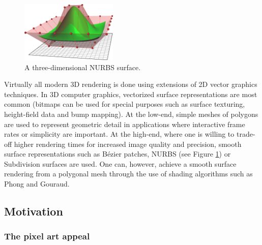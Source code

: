 \documentclass[]{usiinfbachelorproject}
\begin{document}
\begin{figure}
	\centering
	\includegraphics[width=0.41\textwidth]{img/nurbs.png}
	\caption{A three-dimensional NURBS surface.}
	\label{fig:nurbs}
\end{figure}
\noindent Virtually all modern 3D rendering is done using extensions of 2D vector graphics techniques. In 3D computer graphics, vectorized surface representations are most common (bitmaps can be used for special purposes such as surface texturing, height-field data and bump mapping). At the low-end, simple meshes of polygons are used to represent geometric detail in applications where interactive frame rates or simplicity are important. At the high-end, where one is willing to trade-off higher rendering times for increased image quality and precision, smooth surface representations such as B\'ezier patches, NURBS (see Figure \ref{fig:nurbs}) or Subdivision surfaces are used. One can, however, achieve a smooth surface rendering from a polygonal mesh through the use of shading algorithms such as Phong and Gouraud.


\subsection{Motivation}

\subsubsection{The pixel art appeal} \label{sec:appeal}
\end{document}
